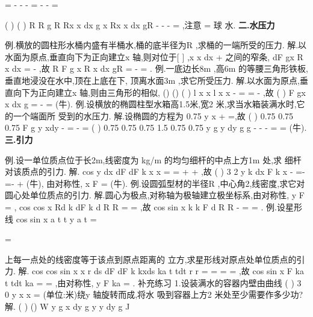 =
-
\cdots 
-
-
=
-
-
=


\int 
\int 
(
)
(
)
R
R
g
R
Rx
x
dx
g
x
Rx
x
dx
gR
\pi 
\rho \pi 
\rho \pi 
\rho 
-
-
-
=
\int 
\int 
,注意\rho 
\rho 
=
球
水. 
\vspace{4pt}
{\bfseries \textcolor{lyred}{二.水压力}}

\textcolor{lyred}{例}.横放的圆柱形水桶内盛有半桶水,桶的底半径为R ,求桶的一端所受的压力. 
解.以水面为原点,垂直向下为正向建立x 轴,则对位于[
]
,x x
dx
+
之间的窄条, 
dF
gx
R
x dx
\rho 
=
\cdots 
-
,故
R
F
g x R
x dx
gR
\rho 
\rho 
=
-
=
\int 
. 
\textcolor{lyred}{例}.一底边长8m ,高6m 的等腰三角形铁板,垂直地浸没在水中,顶在上底在下, 
顶离水面3m ,求它所受压力. 
解.以水面为原点,垂直向下为正向建立x 轴,则由三角形的相似, 
()
()
(
)
l x
x
l x
x
-
=
\Rightarrow 
=
-
,故
(
)
F
gx
x
dx
g
\rho 
\rho 
=
\cdots 
-
=
\int 
(牛). 
\textcolor{lyred}{例}.设横放的椭圆柱型水箱高1.5米,宽2 米,求当水箱装满水时,它的一个端面所 
受到的水压力. 
解.设椭圆的方程为
0.75
y
x +
=,故
(
)
0.75
0.75
0.75
F
g
y
xdy
\rho 
-
=
-
\cdots 
=
\int 
(
)
0.75
0.75
0.75
1.5
0.75
0.75
y
g
y
dy
g
g
\rho 
\rho 
\pi 
\rho \pi 
-
-
-
=
\cdots 
\cdots 
=
\int 
(牛). 
\vspace{4pt}
{\bfseries \textcolor{lyred}{三.引力}}

\textcolor{lyred}{例}.设一单位质点位于长2m,线密度为
kg/m
\mu 
的均匀细杆的中点上方1m 处,求 
细杆对该质点的引力. 
解.
cos
y
dx
dF
dF
k
x
x
\mu 
\alpha 
\cdots 
=
\cdots 
=
\cdots 
+
+
,故
(
)
3 2
y
k dx
F
k
x
\mu 
\mu 
-
=-
=-
+
\int 
(牛), 
由对称性,
x
F =
(牛). 
\textcolor{lyred}{例}.设圆弧型材的半径R ,中心角2\varphi ,线密度\mu ,求它对圆心处单位质点的引力. 
解.圆心为极点,对称轴为极轴建立极坐标系,由对称性,
y
F =
, 
cos
cos
x
Rd
k
dF
k
d
R
R
\mu 
\theta 
\mu 
\theta 
\theta \theta 
\cdots 
=
\cdots 
=
,故
cos
sin
x
k
k
F
d
R
R
\varphi 
\varphi 
\mu 
\mu 
\theta \theta 
\varphi 
-
=
=
\int 
. 
\textcolor{lyred}{例}.设星形线
cos
sin
x
a
t
t
y
a
t
\pi 
=


\le \le 



=



上每一点处的线密度等于该点到原点距离的 
立方,求星形线对原点处单位质点的引力. 
解.
cos
cos
sin
x
x
r ds
dF
dF
k
kxds
ka
t
tdt
r
r
\alpha 
\cdots 
=
\cdots 
=
\cdots 
=
=
,故 
cos
sin
x
F
ka
t
tdt
ka
\pi 
=
=
\int 
,由对称性,
y
F
ka
=
. 
\textcolor{lyred}{补充练习 }
1.设装满水的容器内壁由曲线
(
)
3 0
y
x
x
=
\le 
\le 
(单位:米)绕y 轴旋转而成,将水 
吸到容器上方2 米处至少需要作多少功? 
解.
(
)
()
W
y
g
x dy
g
y
y
dy
g
J
\rho 
\pi 
\rho \pi 
\rho \pi 


